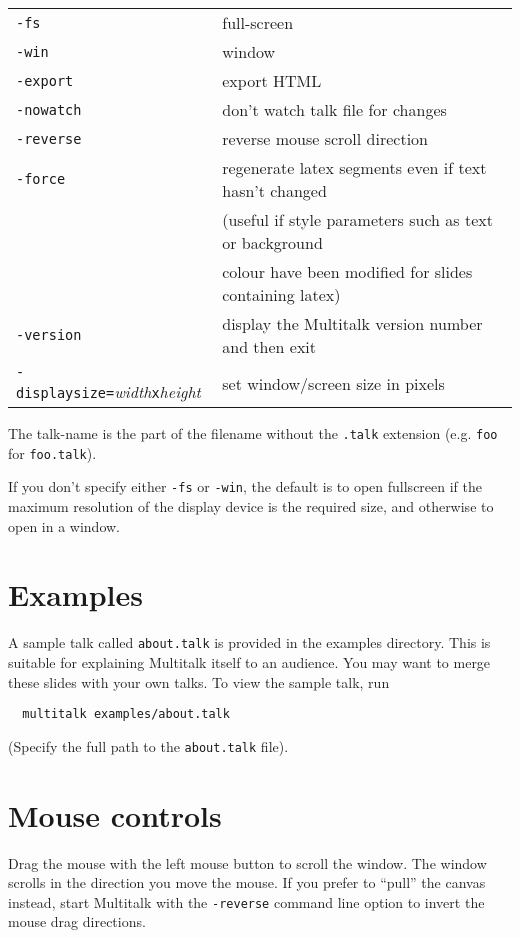 \documentclass[12pt,a4paper,twoside]{article}
\renewcommand{\_}{\texttt{\symbol{95}}}
\begin{document}
\begin{tabular}{ll}
\verb^-fs^      & full-screen\\
\verb^-win^     & window\\
\verb^-export^  & export HTML\\
\verb^-nowatch^ & don't watch talk file for changes\\
\verb^-reverse^ & reverse mouse scroll direction\\
\verb^-force^   & regenerate latex segments even if text hasn't changed\\
         & (useful if style parameters such as text or background\\
         & colour have been modified for slides containing latex)\\
\verb^-version^ & display the Multitalk version number and then exit\\
\verb^-displaysize=^\textit{width}\verb^x^\textit{height}
         & set window/screen size in pixels\\
\end{tabular}

The talk-name is the part of the filename without the \verb=.talk=
extension (e.g. \verb=foo= for \verb=foo.talk=).

If you don't specify either \verb^-fs^ or \verb^-win^,
the default is to open fullscreen if
the maximum resolution of the display device is the required size,
and otherwise to open in a window.

\section{Examples}

A sample talk called \verb=about.talk= is provided in the examples directory.
This is suitable for explaining Multitalk itself to an audience.
You may want to merge these slides with your own talks. To view
the sample talk, run

\begin{verbatim}
  multitalk examples/about.talk
\end{verbatim}
  
(Specify the full path to the \verb=about.talk= file).

\section{Mouse controls}

Drag the mouse with the left mouse button to scroll the window. The
window scrolls in the direction you move the mouse. If you prefer to
``pull'' the canvas instead, start Multitalk with the \verb^-reverse^ command
line option to invert the mouse drag directions.
\end{document}
